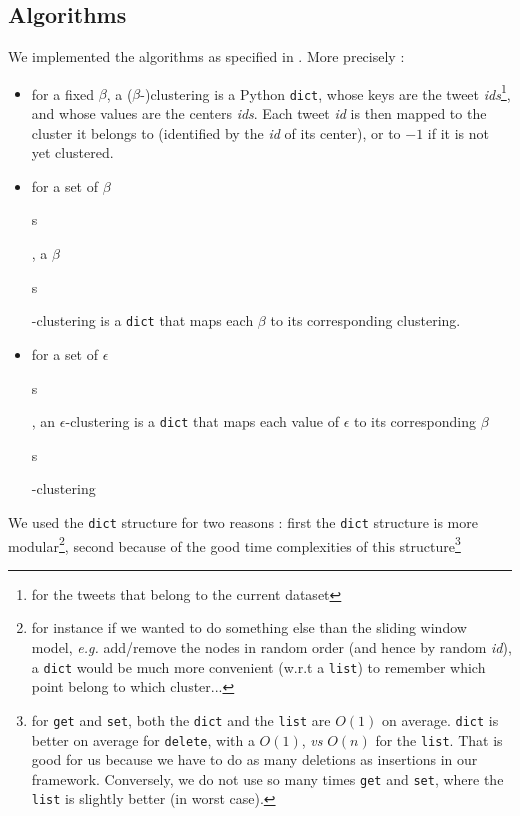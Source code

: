 \documentclass[a4paper,10pt]{article}
\begin{document}
	\subsection{Algorithms}
		We implemented the algorithms as specified in \cite{Chan2017}. More precisely :
		\begin{itemize}
			\item for a fixed $\beta$, a ($\beta$-)clustering is a Python \texttt{dict}, whose keys are the tweet \textit{ids}\footnote{for the tweets that belong to the current dataset}, and whose values are the centers \textit{ids}. Each tweet \textit{id} is then mapped to the cluster it belongs to (identified by the \textit{id} of its center), or to $-1$ if it is not yet clustered.
			\item for a set of $\beta$\begin{tiny}s\end{tiny}, a $\beta$\begin{tiny}s\end{tiny}-clustering is a \texttt{dict} that maps each $\beta$ to its corresponding clustering.
			\item for a set of $\epsilon$\begin{tiny}s\end{tiny}, an $\epsilon$-clustering is a \texttt{dict} that maps each value of $\epsilon$ to its corresponding $\beta$\begin{tiny}s\end{tiny}-clustering
		\end{itemize}
		We used the \texttt{dict} structure for two reasons : first the \texttt{dict} structure is more modular\footnote{for instance if we wanted to do something else than the sliding window model, \textit{e.g.} add/remove the nodes in random order (and hence by random \textit{id}), a \texttt{dict} would be much more convenient (w.r.t a \texttt{list}) to remember which point belong to which cluster...}, second because of the good time complexities of this structure\footnote{for \texttt{get} and \texttt{set}, both the \texttt{dict} and the \texttt{list} are $O(1)$ on average. \texttt{dict} is better on average for \texttt{delete}, with a $O(1)$, \textit{vs} $O(n)$ for the \texttt{list}. That is good for us because we have to do as many deletions as insertions in our framework. Conversely, we do not use so many times \texttt{get} and \texttt{set}, where the \texttt{list} is slightly better (in worst case).}
\end{document}
